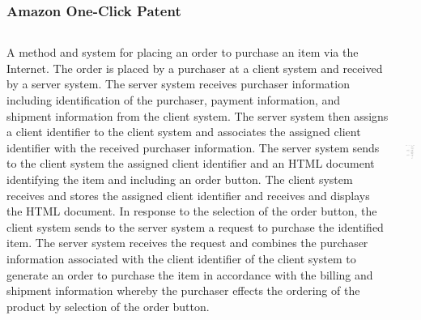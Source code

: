 \documentclass{beamer}
\begin{document}
\begin{frame}[t]
    \frametitle{Amazon One-Click Patent}
  \begin{columns}[T]
    \begin{column}{.5\textwidth}
    \begin{block}{}
    \tiny A method and system for placing an order to purchase an item via the Internet. The order is placed by a purchaser at a client system and received by a server system. The server system receives purchaser information including identification of the purchaser, payment information, and shipment information from the client system. The server system then assigns a client identifier to the client system and associates the assigned client identifier with the received purchaser information. The server system sends to the client system the assigned client identifier and an HTML document identifying the item and including an order button. The client system receives and stores the assigned client identifier and receives and displays the HTML document. In response to the selection of the order button, the client system sends to the server system a request to purchase the identified item. The server system receives the request and combines the purchaser information associated with the client identifier of the client system to generate an order to purchase the item in accordance with the billing and shipment information whereby the purchaser effects the ordering of the product by selection of the order button.
    \end{block}
    \end{column}
    \begin{column}{.5\textwidth}
    \begin{block}{}
      \includegraphics[height=2.75in,angle=0]{Amazon.png}
    \end{block}
    \end{column}
    \end{columns}
\end{frame}
\end{document}
